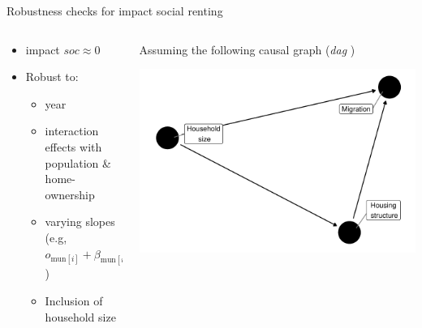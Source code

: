 \documentclass{beamer}
\begin{document}
\begin{frame}{Robustness checks for impact social renting}
			\begin{columns}
		\begin{column}{0.5\textwidth}
			\begin{itemize}
				\item  \alert{impact} $soc \approx 0$ \newline \pause
				\item Robust to:
				\begin{itemize}
					\item year
					\item interaction effects with population \& home-ownership
					\item varying slopes (e.g, $o_{\text{mun}[i]} + \beta_{\text{mun}[i]} \log(\text{soc}_i)$) 
					\item Inclusion of household size\pause
				\end{itemize}
			\end{itemize}
		\end{column}
		\begin{column}{0.5\textwidth} 
			\alert{Assuming} the following causal graph (\emph{dag} )
			\begin{center}
				\includegraphics[width=\textwidth]{../../fig/dag}      
			\end{center}
		\end{column}
	\end{columns}
\end{frame}
\end{document}
